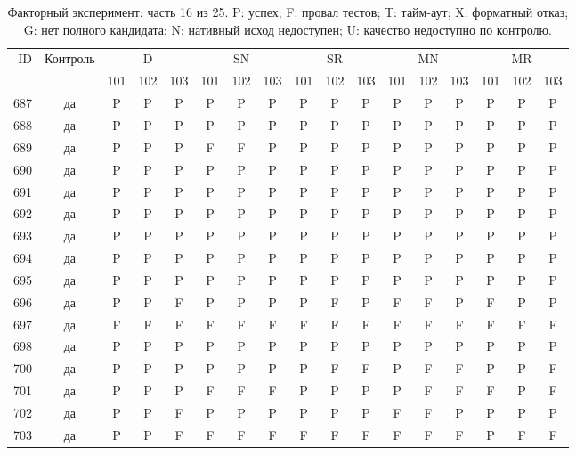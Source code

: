 \begin{table}[p]\centering\footnotesize
\setlength{\tabcolsep}{3pt}
\caption{Факторный эксперимент: часть 16 из 25. P: успех; F: провал тестов; T: тайм-аут; X: форматный отказ; G: нет полного кандидата; N: нативный исход недоступен; U: качество недоступно по контролю.}
\begin{tabular*}{\textwidth}{@{\extracolsep{\fill}}rcccccccccccccccc}\toprule
ID & Контроль & \multicolumn{3}{c}{D} & \multicolumn{3}{c}{SN} & \multicolumn{3}{c}{SR} & \multicolumn{3}{c}{MN} & \multicolumn{3}{c}{MR}\\
\cmidrule(lr){3-5}\cmidrule(lr){6-8}\cmidrule(lr){9-11}\cmidrule(lr){12-14}\cmidrule(lr){15-17}
 & & 101 & 102 & 103 & 101 & 102 & 103 & 101 & 102 & 103 & 101 & 102 & 103 & 101 & 102 & 103\\\midrule
687 & да & P & P & P & P & P & P & P & P & P & P & P & P & P & P & P\\
688 & да & P & P & P & P & P & P & P & P & P & P & P & P & P & P & P\\
689 & да & P & P & P & F & F & P & P & P & P & P & P & P & P & P & P\\
690 & да & P & P & P & P & P & P & P & P & P & P & P & P & P & P & P\\
691 & да & P & P & P & P & P & P & P & P & P & P & P & P & P & P & P\\
692 & да & P & P & P & P & P & P & P & P & P & P & P & P & P & P & P\\
693 & да & P & P & P & P & P & P & P & P & P & P & P & P & P & P & P\\
694 & да & P & P & P & P & P & P & P & P & P & P & P & P & P & P & P\\
695 & да & P & P & P & P & P & P & P & P & P & P & P & P & P & P & P\\
696 & да & P & P & F & P & P & P & P & F & P & F & F & P & F & P & P\\
697 & да & F & F & F & F & F & F & F & F & F & F & F & F & F & F & F\\
698 & да & P & P & P & P & P & P & P & P & P & P & P & P & P & P & P\\
700 & да & P & P & P & P & P & P & P & F & F & P & F & F & P & P & F\\
701 & да & P & P & P & F & F & F & P & P & P & P & F & F & F & P & F\\
702 & да & P & P & F & P & P & P & P & P & P & F & F & P & P & P & P\\
703 & да & P & P & F & F & F & F & F & F & F & F & F & F & P & F & F\\

\end{tabular*}
\end{table}
